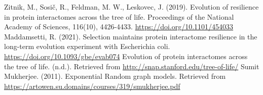 \documentclass[12pt]{article}
\begin{document}
\begin{thebibliography}{1}
  Zitnik, M., Sosič, R., Feldman, M. W., Leskovec, J. (2019). Evolution of resilience in protein interactomes across the tree of life. Proceedings of the National Academy of Sciences, 116(10), 4426-4433. \url{https://doi.org/10.1101/454033}
 Maddamsetti, R. (2021). Selection maintains protein interactome resilience in the long-term evolution experiment with Escherichia coli. \url{https://doi.org/10.1093/gbe/evab074}
 Evolution of protein interactomes across the tree of life. (n.d.). Retrieved from \url{http://snap.stanford.edu/tree-of-life/}
 Sumit Mukherjee. (2011). Exponential Random graph models. Retrieved from \url{https://artowen.su.domains/courses/319/smukherjee.pdf}
  \end{thebibliography}

\end{document}
